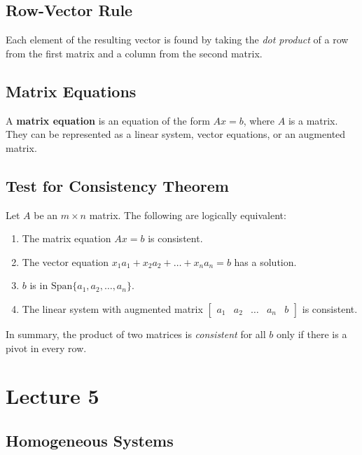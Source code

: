 \documentclass[12pt, letterpaper]{article}
\begin{document}
\subsection*{Row-Vector Rule}

Each element of the resulting vector is found by taking the
\textit{dot product} of a row from the first matrix and a column from
the second matrix.

\subsection*{Matrix Equations}

A \textbf{matrix equation} is an equation of the form $ Ax = b $,
where $ A $ is a matrix. They can be represented as a linear system,
vector equations, or an augmented matrix.

\subsection*{Test for Consistency Theorem}

Let $ A $ be an $ m \times n $ matrix. The following are logically equivalent:

\begin{enumerate}
  \item The matrix equation $ Ax = b $ is consistent.
  \item The vector equation $ x_1a_1 + x_2a_2 + \hdots + x_na_n = b $
    has a solution.
  \item $ b $ is in $ \textrm{Span} \{ a_1, a_2, \hdots, a_n \} $.
  \item The linear system with augmented matrix $
    \begin{bmatrix}a_1 & a_2 & \hdots & a_n & b
    \end{bmatrix} $ is consistent.
\end{enumerate}

\bigskip

In summary, the product of two matrices is \textit{consistent} for
all $ b $ only if there is a pivot in every row.

\section*{Lecture 5}

\subsection*{Homogeneous Systems}
\end{document}

